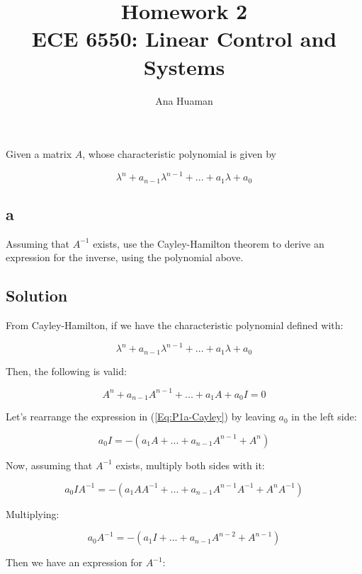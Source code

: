\documentclass[10pt,a4paper]{article}
\author{Ana Huaman}
\title{\textbf{Homework 2} \\ ECE 6550: Linear Control and Systems}
\begin{document}
\maketitle

\section{}
Given a matrix $A$, whose characteristic polynomial is given by

\[ \lambda^{n} + a_{n-1}\lambda^{n-1}+...+a_{1}\lambda + a_{0} \]

\subsection*{a}
Assuming that $A^{-1}$ exists, use the Cayley-Hamilton theorem to derive an expression for the inverse, using the polynomial above.

\subsection*{Solution}

From Cayley-Hamilton, if we have the characteristic polynomial defined with:

\[ \lambda^{n} + a_{n-1}\lambda^{n-1}+...+a_{1}\lambda + a_{0} \]

Then, the following is valid:

\begin{equation} 
A^{n} + a_{n-1}A^{n-1}+...+a_{1}A + a_{0}I  = 0
\label{Eq:P1a-Cayley}
\end{equation}

Let's rearrange the expression in (\ref{Eq:P1a-Cayley}) by leaving $a_{0}$ in the left side:

\[ a_{0}I = - \left ( a_{1}A + ... + a_{n-1}A^{n-1} + A^{n} \right ) \]

Now, assuming that $A^{-1}$ exists, multiply both sides with it:

\[ a_{0}IA^{-1} = - \left ( a_{1}AA^{-1} + ... + a_{n-1}A^{n-1}A^{-1} + A^{n}A^{-1} \right ) \]

Multiplying:

\[ a_{0}A^{-1} = - \left ( a_{1}I + ... + a_{n-1}A^{n-2} + A^{n-1} \right ) \]

Then we have an expression for $A^{-1}$:
\smallskip
\begin{center}
\end{center}
\end{document}
